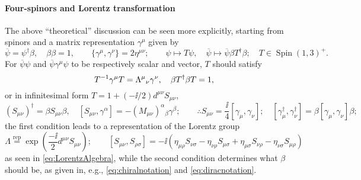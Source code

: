 \documentclass[CheatSheet]{subfiles}
\begin{document}
\paragraph{Four-spinors and Lorentz transformation}
The above ``theoretical'' discussion can be seen more explicitly, starting from spinors and a matrix representation $\gamma^\mu$ given by
\begin{equation}
 \overline\psi = \psi^\dagger\beta, \quad\beta\beta=1,\qquad
\{\gamma^\mu,\gamma^\nu\}=2\eta^{\mu\nu};\qquad
\psi\mapsto T\psi,\quad
\overline\psi\mapsto \overline\psi\beta T^\dagger \beta;\quad T\in \mathop{\mathrm{Spin}}(1,3)^+.
\end{equation}
For $\overline\psi\psi$ and $\overline\psi\gamma^\mu\psi$ to be respectively scalar and vector, $T$ should satisfy
\begin{equation}
 T^{-1}\gamma^\mu T = \Lambda^{\mu}{}_{\nu}\gamma^\nu,\quad
 \beta T^\dagger \beta T=1,
\end{equation}
or in infinitesimal form $T=1+(-\ii/2)d^{\mu\nu}S_{\mu\nu}$,
\begin{equation}
 (S_{\mu\nu})^\dagger = \beta S_{\mu\nu} \beta,\quad
[S_{\mu\nu},\gamma^\alpha] = -(M_{\mu\nu})^{\alpha}{}_\beta\gamma^\beta;
\qquad
\therefore S_{\mu\nu}=\frac{\ii}{4}[\gamma_\mu,\gamma_\nu];
\quad
[\gamma_\mu^\dagger, \gamma_\nu^\dagger]=\beta[\gamma_\mu,\gamma_\nu]\beta;
\label{eq:betacondition}
\end{equation}
the first condition leads to a representation of the Lorentz group
\begin{equation}
\Lambda\stackrel{\text{rep}}=
 \exp\left(\frac{-\ii}{2}d^{\mu\nu}S_{\mu\nu}\right);\qquad
 [S_{\mu\nu},S_{\rho\sigma}] = -\ii\left(
\eta_{\mu\rho} S_{\nu\sigma}
-\eta_{\nu\rho} S_{\mu\sigma}
+\eta_{\mu\sigma} S_{\nu\rho}
-\eta_{\nu\sigma} S_{\mu\rho}\right)
\end{equation}
as seen in \cref{eq:LorentzAlgebra}, while the second condition determines what $\beta$ should be, as given in, e.g., \cref{eq:chiralnotation} and \cref{eq:diracnotation}.
\end{document}

